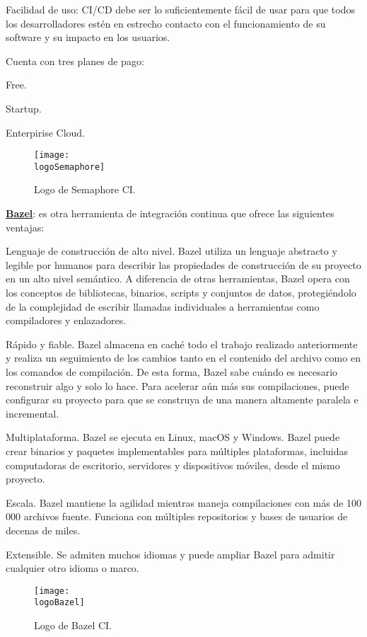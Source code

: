 \begin{compactitem}
\begin{compactitem}
        \item Facilidad de uso: CI/CD debe ser lo suficientemente fácil de usar para que todos los desarrolladores estén en estrecho contacto con el funcionamiento de su software y su impacto en los usuarios.
    \end{compactitem}
    Cuenta con tres planes de pago:
    \begin{compactitem}
        \item Free.
        \item Startup.
        \item Enterpirise Cloud.
    \end{compactitem}
    \begin{figure}[h]
        \centering
        \texttt{[image: \\logoSemaphore]}
        \caption{Logo de Semaphore CI.}
    \end{figure}
    \item \textbf{\underline{Bazel}}: es otra herramienta de integración continua que ofrece las siguientes ventajas:
    \begin{compactitem}
        \item Lenguaje de construcción de alto nivel. Bazel utiliza un lenguaje abstracto y legible por humanos para describir las propiedades de construcción de su proyecto en un alto nivel semántico. A diferencia de otras herramientas, Bazel opera con los conceptos de bibliotecas, binarios, scripts y conjuntos de datos, protegiéndolo de la complejidad de escribir llamadas individuales a herramientas como compiladores y enlazadores.
        \item Rápido y fiable. Bazel almacena en caché todo el trabajo realizado anteriormente y realiza un seguimiento de los cambios tanto en el contenido del archivo como en los comandos de compilación. De esta forma, Bazel sabe cuándo es necesario reconstruir algo y solo lo hace. Para acelerar aún más sus compilaciones, puede configurar su proyecto para que se construya de una manera altamente paralela e incremental.
        \item Multiplataforma. Bazel se ejecuta en Linux, macOS y Windows. Bazel puede crear binarios y paquetes implementables para múltiples plataformas, incluidas computadoras de escritorio, servidores y dispositivos móviles, desde el mismo proyecto.
        \item Escala. Bazel mantiene la agilidad mientras maneja compilaciones con más de 100 000 archivos fuente. Funciona con múltiples repositorios y bases de usuarios de decenas de miles.
        \item Extensible. Se admiten muchos idiomas y puede ampliar Bazel para admitir cualquier otro idioma o marco.
    \end{compactitem}
    \begin{figure}[h]
        \centering
        \texttt{[image: \\logoBazel]}
        \caption{Logo de Bazel CI.}
    \end{figure}
\end{compactitem}

